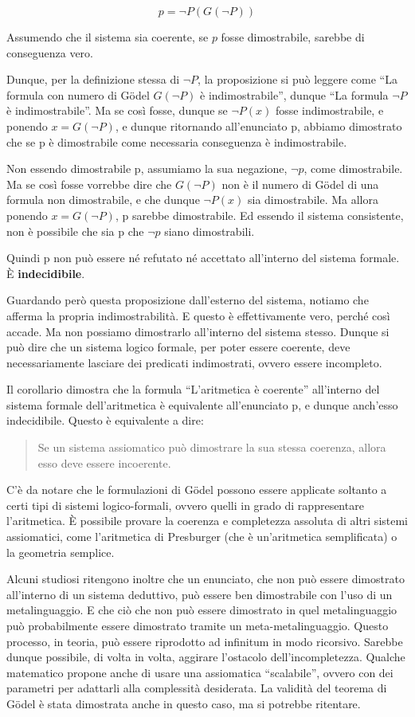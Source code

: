 \documentclass[a4paper,10pt]{article}
\begin{document}
$$
p = \neg P(G(\neg P))
$$

Assumendo che il sistema sia coerente, se $p$ fosse dimostrabile, sarebbe di conseguenza vero. 

Dunque, per la definizione stessa di $\neg P$, la proposizione si può leggere come “La formula con numero di Gödel $G(\neg P)$ è indimostrabile”, dunque “La formula $\neg P$ è indimostrabile”. Ma se così fosse, dunque se $\neg P(x)$ fosse indimostrabile, e ponendo $x = G(\neg P)$, e dunque ritornando all'enunciato p, abbiamo dimostrato che se p è dimostrabile come necessaria conseguenza è indimostrabile.

Non essendo dimostrabile p, assumiamo la sua negazione, $\neg p$, come dimostrabile. Ma se così fosse vorrebbe dire che $G(\neg P)$ non è il numero di Gödel di una formula non dimostrabile, e che dunque $\neg P(x)$ sia dimostrabile. Ma allora ponendo $x = G(\neg P)$, p sarebbe dimostrabile. Ed essendo il sistema consistente, non è possibile che sia p che $\neg p$ siano dimostrabili.

Quindi p non può essere né refutato né accettato all'interno del sistema formale. È \textbf{indecidibile}.

Guardando però questa proposizione dall'esterno del sistema, notiamo che afferma la propria indimostrabilità. E questo è effettivamente vero, perché così accade. Ma non possiamo dimostrarlo all'interno del sistema stesso. Dunque si può dire che un sistema logico formale, per poter essere coerente, deve necessariamente lasciare dei predicati indimostrati, ovvero essere incompleto.

Il corollario dimostra che la formula “L'aritmetica è coerente” all'interno del sistema formale dell'aritmetica è equivalente all'enunciato p, e dunque anch'esso indecidibile. Questo è equivalente a dire:

\begin{quote}
Se un sistema assiomatico può dimostrare la sua stessa coerenza, allora esso deve essere incoerente.
\end{quote}

C'è da notare che le formulazioni di Gödel possono essere applicate soltanto a certi tipi di sistemi logico-formali, ovvero quelli in grado di rappresentare l'aritmetica. È possibile provare la coerenza e completezza assoluta di altri sistemi assiomatici, come l'aritmetica di Presburger (che è un'aritmetica semplificata) o la geometria semplice.

Alcuni studiosi ritengono inoltre che un enunciato, che non può essere dimostrato all'interno di un sistema deduttivo, può essere ben dimostrabile con l'uso di un metalinguaggio.
E che ciò che non può essere dimostrato in quel metalinguaggio può probabilmente essere dimostrato tramite un meta-metalinguaggio.
Questo processo, in teoria, può essere riprodotto ad infinitum in modo ricorsivo. Sarebbe dunque possibile, di volta in volta, aggirare l'ostacolo dell'incompletezza.
Qualche matematico propone anche di usare una assiomatica “scalabile”, ovvero con dei parametri per adattarli alla complessità desiderata.
La validità del teorema di Gödel è stata dimostrata anche in questo caso, ma si potrebbe ritentare.
\end{document}
